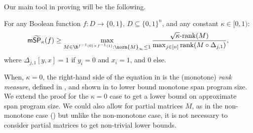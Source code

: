 \documentclass{toc}
\begin{document}
\noindent Our main tool in proving  will be the following.
\begin{theorem}\label{thm:approx-rank-mSP}
For any Boolean function $f:D\rightarrow\{0,1\}$, $D\subseteq \{0,1\}^n$, and any constant $\kappa\in [0,1)$:
$$\mathsf{m}\widetilde{\mathsf{SP}}_{\kappa}(f)\geq \max_{M\in\R^{f^{-1}(0)\times f^{-1}(1)}:\norm{M}_\infty\leq 1}\frac{\sqrt{\kappa}\mbox{-}\mathrm{rank}(M)}{\max_{j\in [n]}\mathrm{rank}(M\circ\Delta_{j,1})},$$
where $\Delta_{j,1}[y,x]=1$ if $y_i=0$ and $x_i=1$, and 0 else. 
\end{theorem}
When, $\kappa=0$, the right-hand side of the equation in  is the (monotone) \emph{rank measure}, defined in \cite{Raz90}, and shown in \cite{Gal01} to lower bound monotone span program size. We extend the proof for the $\kappa=0$ case to get a lower bound on approximate span program size. We could also allow for partial matrices $M$, as in the non-monotone case () but unlike the non-monotone case, it is not necessary to consider partial matrices to get non-trivial lower bounds.
\end{document}
